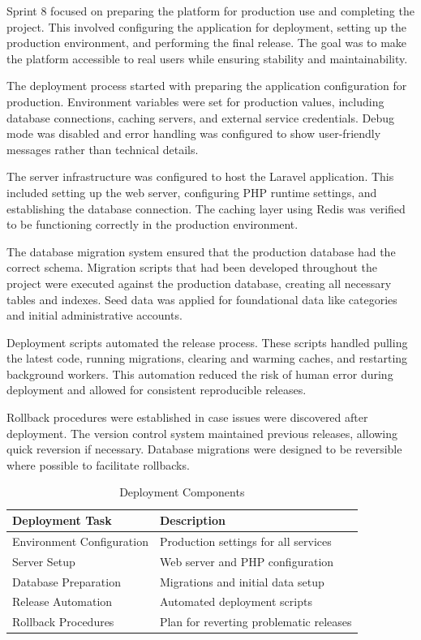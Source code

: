 Sprint 8 focused on preparing the platform for production use
and completing the project. This involved configuring the
application for deployment, setting up the production environment,
and performing the final release. The goal was to make the
platform accessible to real users while ensuring stability
and maintainability.

The deployment process started with preparing the application
configuration for production. Environment variables were set
for production values, including database connections, caching
servers, and external service credentials. Debug mode was
disabled and error handling was configured to show user-friendly
messages rather than technical details.

The server infrastructure was configured to host the Laravel
application. This included setting up the web server, configuring
PHP runtime settings, and establishing the database connection.
The caching layer using Redis was verified to be functioning
correctly in the production environment.

The database migration system ensured that the production
database had the correct schema. Migration scripts that had
been developed throughout the project were executed against
the production database, creating all necessary tables and
indexes. Seed data was applied for foundational data like
categories and initial administrative accounts.

Deployment scripts automated the release process. These scripts
handled pulling the latest code, running migrations, clearing
and warming caches, and restarting background workers. This
automation reduced the risk of human error during deployment
and allowed for consistent reproducible releases.

Rollback procedures were established in case issues were
discovered after deployment. The version control system
maintained previous releases, allowing quick reversion if
necessary. Database migrations were designed to be reversible
where possible to facilitate rollbacks.

\begin{table}[H]
\begin{center}
\begin{tabular}{|m{3.5cm}|m{5.5cm}|}
\hline
\textbf{Deployment Task} & \textbf{Description} \\ \hline
Environment Configuration & Production settings for all services \\ \hline
Server Setup & Web server and PHP configuration \\ \hline
Database Preparation & Migrations and initial data setup \\ \hline
Release Automation & Automated deployment scripts \\ \hline
Rollback Procedures & Plan for reverting problematic releases \\ \hline
\end{tabular}
\caption{Deployment Components}
\label{tab:deployment_components}
\end{center}
\end{table}

